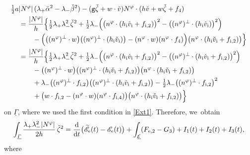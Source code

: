 \documentclass[10pt]{amsart}
\newcommand{\gr}{{\mathtt g}}
\newcommand{\cE}{{\mathcal E}}
\newcommand{\ul}[1]{\underline{#1}}
\newcommand{\itGamma}{\mathit{\Gamma}}
\theoremstyle{definition}
\begin{document}
\begin{align*}
\tfrac12a&|N^\varphi|\,(\lambda_+\check{\alpha}^2-\lambda_-\check{\beta}^2)
- (\gr\check{\zeta}+w\cdot\check{v})N^\varphi\cdot(h\check{v}+w\check{\zeta}+f_4) \\
&= \frac{|N^\varphi|}{h}\Bigl\{ \tfrac12\lambda_+\lambda_-^2\check{\zeta}^2
+ \tfrac12\lambda_-\Bigl(\bigl(n^\varphi\cdot(h_\mathrm{i}\check{v}_\mathrm{i}+f_{{\rm i},2}) \bigr)^2 - \bigl((n^\varphi)^\perp\cdot(h_\mathrm{i}\check{v}_\mathrm{i}) \bigr)^2 \Bigr) \\
&\qquad
- \Bigl(\bigl((n^\varphi)^\perp\cdot w \bigr) \bigl((n^\varphi)^\perp\cdot(h_\mathrm{i}\check{v}_\mathrm{i}) \bigr)
- (n^\varphi\cdot w)(n^\varphi\cdot f_4) \Bigr) \bigl(n^\varphi\cdot(h_\mathrm{i}\check{v}_\mathrm{i}+f_{{\rm i},2}) \bigr) \Bigr\} \\
&= \frac{|N^\varphi|}{h}\Bigl\{ \tfrac12\lambda_+\lambda_-^2\check{\zeta}^2
+ \tfrac12\lambda_-\Bigl(\bigl(n^\varphi\cdot(h_\mathrm{i}\check{v}_\mathrm{i}+f_{{\rm i},2}) \bigr)^2
- \bigl((n^\varphi)^\perp\cdot(h_\mathrm{i}\check{v}_\mathrm{i}+f_{{\rm i},2}) \bigr)^2 \Bigr) \\
&\qquad
- \bigl((n^\varphi)^\perp\cdot w \bigr) \bigl((n^\varphi)^\perp\cdot(h_\mathrm{i}\check{v}_\mathrm{i}+f_{{\rm i},2}) \bigr) \bigl(n^\varphi\cdot(h_\mathrm{i}\check{v}_\mathrm{i}+f_{{\rm i},2}) \bigr) \\
&\qquad
+ \lambda_- \bigl((n^\varphi)^\perp\cdot f_{{\rm i},2} \bigr) \bigl((n^\varphi)^\perp\cdot(h_\mathrm{i}\check{v}_\mathrm{i}+f_{{\rm i},2}) \bigr)
- \tfrac12\lambda_- \bigl((n^\varphi)^\perp\cdot f_{{\rm i},2} \bigr)^2 \\
&\qquad
+ \bigl(w\cdot f_{{\rm i},2} - (n^\varphi\cdot w)(n^\varphi\cdot f_{{\rm i},4}) \bigr) \bigl(n^\varphi\cdot(h_\mathrm{i}\check{v}_\mathrm{i}+f_{{\rm i},2}) \bigr) \Bigr\}
\end{align*}
on $\ul{\itGamma}$, where we used the first condition in \eqref{Ext1}.
Therefore, we~obtain
\begin{equation}\label{EqCF6}
\int_{\ul{\itGamma}}\frac{\lambda_+\lambda_-^2|N^\varphi|}{2h}\,\check{\zeta}^2
= \frac{\rm d}{{\rm d}t} \bigl(\widetilde{\mathscr{E}}_\mathrm{e}(t)-\mathscr{E}_\mathrm{e}(t) \bigr) + \int_{\ul{\cE}}(F_{{\rm e},2}-G_3) + I_1(t) + I_2(t) + I_3(t),
\end{equation}
where
\end{document}
